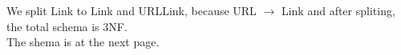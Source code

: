 \documentclass{article}
\begin{document}
We split Link to Link and URLLink, because URL $\rightarrow$ Link and after spliting, the total schema is 3NF.\\

The shema is at the next page.
 
\newpage
\end{document}
